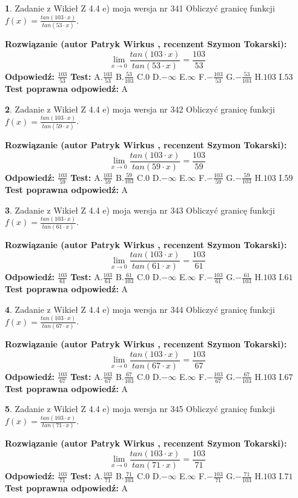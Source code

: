 \documentclass[12pt, a4paper]{article}
\theoremstyle{definition} %
\newtheorem{zad}{}
\newcommand{\zadStart}[1]{\begin{zad}#1\newline}
\newcommand{\zadStop}{\end{zad}}
\newcommand{\rozwStart}[2]{\noindent \textbf{Rozwiązanie (autor #1 , recenzent #2): }\newline}
\newcommand{\rozwStop}{\newline}
\newcommand{\odpStart}{\noindent \textbf{Odpowiedź:}\newline}
\newcommand{\odpStop}{\newline}
\newcommand{\testStart}{\noindent \textbf{Test:}\newline}
\newcommand{\testStop}{\newline}
\newcommand{\kluczStart}{\noindent \textbf{Test poprawna odpowiedź:}\newline}
\newcommand{\kluczStop}{\newline}
\begin{document}
\zadStart{Zadanie z Wikieł Z 4.4 e) moja wersja nr 341}
Obliczyć granicę funkcji $f(x)=\frac{tan(103\cdot x)}{tan(53\cdot x)}$.
\zadStop
\rozwStart{Patryk Wirkus}{Szymon Tokarski}
$$\lim\limits_{x\to 0}\frac{tan(103\cdot x)}{tan(53\cdot x)}=
\frac{103}{53}$$
\rozwStop
\odpStart
$\frac{103}{53}$
\odpStop
\testStart
A.$\frac{103}{53}$
B.$\frac{53}{103}$
C.$0$
D.$-\infty$
E.$\infty$
F.$-\frac{103}{53}$
G.$-\frac{53}{103}$
H.$103$
I.$53$
\testStop
\kluczStart
A
\kluczStop



\zadStart{Zadanie z Wikieł Z 4.4 e) moja wersja nr 342}
Obliczyć granicę funkcji $f(x)=\frac{tan(103\cdot x)}{tan(59\cdot x)}$.
\zadStop
\rozwStart{Patryk Wirkus}{Szymon Tokarski}
$$\lim\limits_{x\to 0}\frac{tan(103\cdot x)}{tan(59\cdot x)}=
\frac{103}{59}$$
\rozwStop
\odpStart
$\frac{103}{59}$
\odpStop
\testStart
A.$\frac{103}{59}$
B.$\frac{59}{103}$
C.$0$
D.$-\infty$
E.$\infty$
F.$-\frac{103}{59}$
G.$-\frac{59}{103}$
H.$103$
I.$59$
\testStop
\kluczStart
A
\kluczStop



\zadStart{Zadanie z Wikieł Z 4.4 e) moja wersja nr 343}
Obliczyć granicę funkcji $f(x)=\frac{tan(103\cdot x)}{tan(61\cdot x)}$.
\zadStop
\rozwStart{Patryk Wirkus}{Szymon Tokarski}
$$\lim\limits_{x\to 0}\frac{tan(103\cdot x)}{tan(61\cdot x)}=
\frac{103}{61}$$
\rozwStop
\odpStart
$\frac{103}{61}$
\odpStop
\testStart
A.$\frac{103}{61}$
B.$\frac{61}{103}$
C.$0$
D.$-\infty$
E.$\infty$
F.$-\frac{103}{61}$
G.$-\frac{61}{103}$
H.$103$
I.$61$
\testStop
\kluczStart
A
\kluczStop



\zadStart{Zadanie z Wikieł Z 4.4 e) moja wersja nr 344}
Obliczyć granicę funkcji $f(x)=\frac{tan(103\cdot x)}{tan(67\cdot x)}$.
\zadStop
\rozwStart{Patryk Wirkus}{Szymon Tokarski}
$$\lim\limits_{x\to 0}\frac{tan(103\cdot x)}{tan(67\cdot x)}=
\frac{103}{67}$$
\rozwStop
\odpStart
$\frac{103}{67}$
\odpStop
\testStart
A.$\frac{103}{67}$
B.$\frac{67}{103}$
C.$0$
D.$-\infty$
E.$\infty$
F.$-\frac{103}{67}$
G.$-\frac{67}{103}$
H.$103$
I.$67$
\testStop
\kluczStart
A
\kluczStop



\zadStart{Zadanie z Wikieł Z 4.4 e) moja wersja nr 345}
Obliczyć granicę funkcji $f(x)=\frac{tan(103\cdot x)}{tan(71\cdot x)}$.
\zadStop
\rozwStart{Patryk Wirkus}{Szymon Tokarski}
$$\lim\limits_{x\to 0}\frac{tan(103\cdot x)}{tan(71\cdot x)}=
\frac{103}{71}$$
\rozwStop
\odpStart
$\frac{103}{71}$
\odpStop
\testStart
A.$\frac{103}{71}$
B.$\frac{71}{103}$
C.$0$
D.$-\infty$
E.$\infty$
F.$-\frac{103}{71}$
G.$-\frac{71}{103}$
H.$103$
I.$71$
\testStop
\kluczStart
A
\kluczStop
\end{document}
